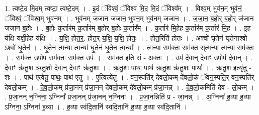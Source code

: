 \documentclass[17pt]{extarticle}
\begin{document}
1. त्वष्टे॒द मि॒दम् त्वष्टा॒ त्वष्टे॒दम् । . इ॒दं ॅविश्वं॒ ॅविश्व॑ मि॒द मि॒दं ॅविश्व᳚म् । . विश्व॒म् भुव॑न॒म् भुव॑नं॒ ॅविश्वं॒ ॅविश्व॒म् भुव॑नम् । . भुव॑नम् जजान जजान॒ भुव॑न॒म् भुव॑नम् जजान । . ज॒जा॒न॒ ब॒होर् ब॒होर् ज॑जान जजान ब॒होः । . ब॒होः क॒र्तार॑म् क॒र्तार॑म् ब॒होर् ब॒होः क॒र्तार᳚म् । . क॒र्तार॑ मि॒हेह क॒र्तार॑म् क॒र्तार॑ मि॒ह । . इ॒ह य॑क्षि यक्षी॒हेह य॑क्षि । . य॒क्षि॒ हो॒त॒र्॒. हो॒त॒र् य॒क्षि॒ य॒क्षि॒ हो॒तः॒ । . हो॒त॒रिति॑ होतः । . अश्वो॑ घृ॒तेन॑ घृ॒तेनाश्वो ऽश्वो॑ घृ॒तेन॑ । . घृ॒तेन॒ त्मन्या॒ त्मन्या॑ घृ॒तेन॑ घृ॒तेन॒ त्मन्या᳚ । . त्मन्या॒ सम॑क्तः॒ सम॑क्त॒ स्‌त्मन्या॒ त्मन्या॒ सम॑क्तः । . सम॑क्त॒ उपोप॒ सम॑क्तः॒ सम॑क्त॒ उप॑ । . सम॑क्त॒ इति॒ सं - अ॒क्तः॒ । . उप॑ दे॒वान् दे॒वाꣳ उपोप॑ दे॒वान् । . दे॒वाꣳ ऋ॑तु॒श ऋ॑तु॒शो दे॒वान् दे॒वाꣳ ऋ॑तु॒शः । . ऋ॒तु॒शः पाथः॒ पाथ॑ ऋतु॒श ऋ॑तु॒शः पाथः॑ । . ऋ॒तु॒श इत्यृ॑तु - शः । . पाथ॑ एत्वेतु॒ पाथः॒ पाथ॑ एतु । . ए॒त्वित्ये॑तु । . वन॒स्पति॑र् देवलो॒कम् दे॑वलो॒कं ॅवन॒स्पति॒र् वन॒स्पति॑र् देवलो॒कम् । . दे॒व॒लो॒कम् प्र॑जा॒नन् प्र॑जा॒नन् दे॑वलो॒कम् दे॑वलो॒कम् प्र॑जा॒नन्न् । . दे॒व॒लो॒कमिति॑ देव - लो॒कम् । . प्र॒जा॒नन् न॒ग्निना॒ ऽग्निना᳚ प्रजा॒नन् प्र॑जा॒नन् न॒ग्निना᳚ । . प्र॒जा॒नन्निति॑ प्र - जा॒नन्न् । . अ॒ग्निना॑ ह॒व्या ह॒व्या ऽग्निना॒ ऽग्निना॑ ह॒व्या । . ह॒व्या स्व॑दि॒तानि॑ स्वदि॒तानि॑ ह॒व्या ह॒व्या स्व॑दि॒तानि॑ । \newline
\end{document}
